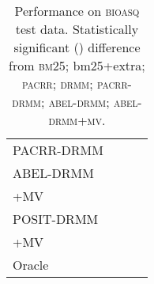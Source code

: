 \documentclass[11pt,a4paper]{article}
\newcommand{\bioasq}{\textsc{bioasq}\xspace}
\newcommand{\drmm}{\textsc{drmm}\xspace}
\newcommand{\pacrr}{\textsc{pacrr}\xspace}
\newcommand{\pacrrdrmm}{\textsc{pacrr-drmm}\xspace}
\newcommand{\abeldrmm}{\textsc{abel-drmm}\xspace}
\newcommand{\abeldrmmmv}{\textsc{abel-drmm+mv}\xspace}
\newcommand{\bmtf}{\textsc{bm25}\xspace}
\begin{document}
\begin{table*}[t]
\begin{minipage}{3.1in}
\begin{center}
\begin{tabular}{|llll|}
PACRR-DRMM  &  &  &  \\
ABEL-DRMM   &  &  &  \\
+MV  &  &  &  \\
POSIT-DRMM  &  &  &  \\
+MV  &  &  & \\ \hline\hline
Oracle      &  &  &  \\ \hline
\end{tabular}
\end{center}
\end{minipage}
\vspace{-0.1in}
\caption{Performance on \bioasq test data. Statistically significant ()
difference from  \bmtf; {\sc bm25}+extra; \pacrr; \drmm; \pacrrdrmm; \abeldrmm; \abeldrmmmv.}
\vspace{-1mm}
\label{tab:bioasq-main}
\end{table*}
\end{document}
